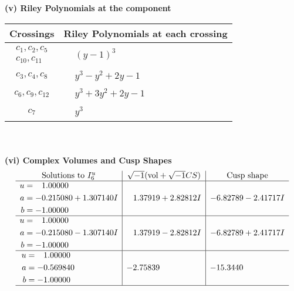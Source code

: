 \documentclass[1p]{elsarticle_modified}
\theoremstyle{definition}
\newcommand{\I}{\sqrt{-1}}
\begin{document}
\newpage\renewcommand{\arraystretch}{1}
\flushleft \textbf{(v) Riley Polynomials at the component}\newline \\
\begin{tabular}{m{50pt}|m{274pt}}
Crossings & \hspace{64pt}Riley Polynomials at each crossing \\
\hline $$\begin{aligned}c_{1},c_{2},c_{5}\\c_{10},c_{11}\end{aligned}$$&$\begin{aligned}
&(y-1)^3
\end{aligned}$\\
\hline $$\begin{aligned}c_{3},c_{4},c_{8}\end{aligned}$$&$\begin{aligned}
&y^3- y^2+2 y-1
\end{aligned}$\\
\hline $$\begin{aligned}c_{6},c_{9},c_{12}\end{aligned}$$&$\begin{aligned}
&y^3+3 y^2+2 y-1
\end{aligned}$\\
\hline $$\begin{aligned}c_{7}\end{aligned}$$&$\begin{aligned}
&y^3
\end{aligned}$\\
\hline
\end{tabular}\\~\\
\newpage\flushleft \textbf{(vi) Complex Volumes and Cusp Shapes}
$$\begin{array}{c|c|c}  
\text{Solutions to }I^u_{6}& \I (\text{vol} + \sqrt{-1}CS) & \text{Cusp shape}\\
 \hline 
\begin{aligned}
u &= \phantom{-}1.00000\phantom{ +0.000000I} \\
a &= -0.215080 + 1.307140 I \\
b &= -1.00000\phantom{ +0.000000I}\end{aligned}
 & \phantom{-}1.37919 + 2.82812 I & -6.82789 - 2.41717 I \\ \hline\begin{aligned}
u &= \phantom{-}1.00000\phantom{ +0.000000I} \\
a &= -0.215080 - 1.307140 I \\
b &= -1.00000\phantom{ +0.000000I}\end{aligned}
 & \phantom{-}1.37919 - 2.82812 I & -6.82789 + 2.41717 I \\ \hline\begin{aligned}
u &= \phantom{-}1.00000\phantom{ +0.000000I} \\
a &= -0.569840\phantom{ +0.000000I} \\
b &= -1.00000\phantom{ +0.000000I}\end{aligned}
 & -2.75839\phantom{ +0.000000I} & -15.3440\phantom{ +0.000000I}\\
 \hline 
 \end{array}$$\newpage
\end{document}
